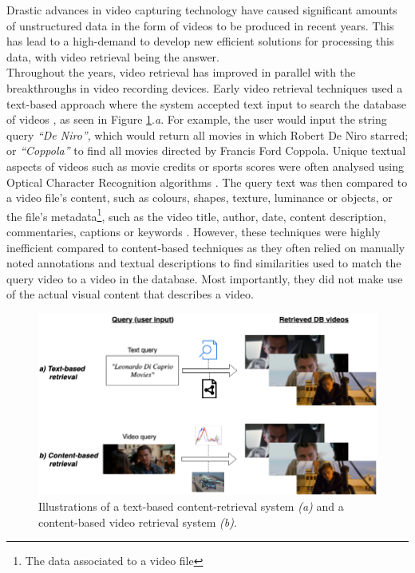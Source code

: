 Drastic advances in video capturing technology have caused significant amounts of unstructured data in the form of videos to be produced in recent years. This has lead to a high-demand to develop new efficient solutions for processing this data, with video retrieval being the answer.\\

Throughout the years, video retrieval has improved in parallel with the breakthroughs in video recording devices. Early video retrieval techniques used a text-based approach where the system accepted text input to search the database of videos \cite{lai2015trajectory}, as seen in Figure \ref{fig:text_vs_content_retrieval}.\emph{a}. For example, the user would input the string query \textit{``De Niro''}, which would return all movies in which Robert De Niro starred; or \textit{``Coppola''} to find all movies directed by Francis Ford Coppola. Unique textual aspects of videos such as movie credits or sports scores were often analysed using Optical Character Recognition algorithms \cite{li2002text}. The query text was then compared to a video file's content, such as colours, shapes, texture, luminance or objects, or the file's metadata\footnote{The data associated to a video file}, such as the video title, author, date, content description, commentaries, captions or keywords \cite{li2002text} \cite{feng2011} \cite{patel2012}. However, these techniques were highly inefficient compared to content-based techniques as they often relied on manually noted annotations and textual descriptions to find similarities used to match the query video to a video in the database. Most importantly, they did not make use of the actual visual content that describes a video.\\

\begin{figure}[h]
\centerline{\includegraphics[width=\textwidth]{figures/litsurvey/content_text-retrieval_comparison.png}}
\caption{\label{fig:text_vs_content_retrieval}Illustrations of a text-based content-retrieval system \emph{(a)} and a content-based video retrieval system \emph{(b)}.}
\end{figure}

